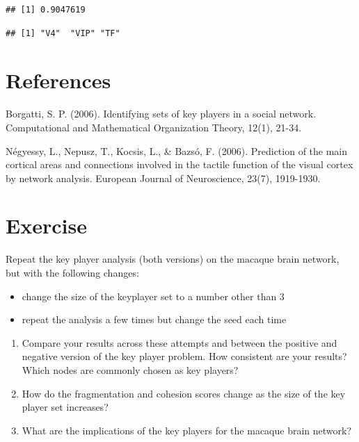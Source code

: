 \documentclass[
]{book}
\newenvironment{Shaded}{\begin{snugshade}}{\end{snugshade}}
\newcommand{\CommentTok}[1]{\textcolor[rgb]{0.56,0.35,0.01}{\textit{#1}}}
\newcommand{\FunctionTok}[1]{\textcolor[rgb]{0.13,0.29,0.53}{\textbf{#1}}}
\newcommand{\NormalTok}[1]{#1}
\newcommand{\SpecialCharTok}[1]{\textcolor[rgb]{0.81,0.36,0.00}{\textbf{#1}}}
\providecommand{\tightlist}{%
  \setlength{\itemsep}{0pt}\setlength{\parskip}{0pt}}
\begin{document}
\begin{verbatim}
## [1] 0.9047619
\end{verbatim}

\begin{Shaded}
\end{Shaded}

\begin{verbatim}
## [1] "V4"  "VIP" "TF"
\end{verbatim}

\section{References}\label{references-1}

Borgatti, S. P. (2006). Identifying sets of key players in a social network. Computational and Mathematical Organization Theory, 12(1), 21-34.

Négyessy, L., Nepusz, T., Kocsis, L., \& Bazsó, F. (2006). Prediction of the main cortical areas and connections involved in the tactile function of the visual cortex by network analysis. European Journal of Neuroscience, 23(7), 1919-1930.

\section{Exercise}\label{exercise-10}

Repeat the key player analysis (both versions) on the macaque brain network, but with the following changes:

\begin{itemize}
\tightlist
\item
  change the size of the keyplayer set to a number other than 3
\item
  repeat the analysis a few times but change the seed each time
\end{itemize}

\begin{enumerate}
\def\labelenumi{\arabic{enumi}.}
\tightlist
\item
  Compare your results across these attempts and between the positive and negative version of the key player problem. How consistent are your results? Which nodes are commonly chosen as key players?
\item
  How do the fragmentation and cohesion scores change as the size of the key player set increases?
\item
  What are the implications of the key players for the macaque brain network?
\end{enumerate}
\end{document}
